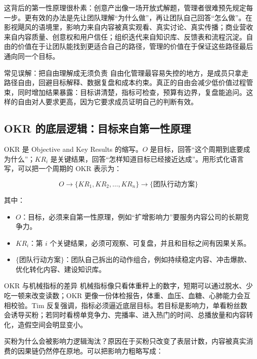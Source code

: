 这背后的第一性原理很朴素：创意产出像一场开放式解题，管理者很难预先规定每一步。更有效的办法是先让团队理解“为什么做”，再让团队自己回答“怎么做”。在影视飓风的语境里，影响力来自内容被真实观看、真实讨论、真实传播；商业营收来自内容质量、创意权和用户信任；组织迭代来自知识库、反馈表和流程沉淀。自由的价值在于让团队能找到更适合自己的路径，管理的价值在于保证这些路径最后通向同一个目标。

\begin{warningbox}{常见误解：把自由理解成无须负责}
自由化管理最容易失控的地方，是成员只拿走路径自由，回避目标解释、数据复盘和成本约束。真正的自由会减少低价值过程管束，同时增加结果暴露：目标讲清楚，指标可检查，预算有边界，复盘能追问。这样的自由对人要求更高，因为它要求成员证明自己的判断有效。
\end{warningbox}

\subsection{OKR 的底层逻辑：目标来自第一性原理}

OKR 是 Objective and Key Results 的缩写。$O$ 是目标，回答“这个周期到底要成为什么”；$KR_i$ 是关键结果，回答“怎样知道目标已经接近达成”。用形式化语言写，可以把一个周期的 OKR 表示为：

$$
O \longrightarrow \{KR_1, KR_2, \ldots, KR_n\} \longrightarrow \{\text{团队行动方案}\}
$$

其中：
\begin{itemize}
  \item $O$：目标，必须来自第一性原理，例如“扩增影响力”要服务内容公司的长期竞争力。
  \item $KR_i$：第 $i$ 个关键结果，必须可观察、可复盘，并且和目标之间有因果关系。
  \item $\{\text{团队行动方案}\}$：团队自己拆出的动作组合，例如持续稳定内容、冲击爆款、优化转化内容、建设知识库。
\end{itemize}

\begin{knowledgebox}{OKR 与机械指标的差异}
机械指标像只看体重秤上的数字，短期可以通过脱水、少吃一顿来改变读数；OKR 更像一份体检报告，体重、血压、血糖、心肺能力会互相校验。Tim 反复强调，指标必须逼近底层目标。若目标是影响力，单看粉丝数会诱导买粉；若同时看榜单竞争力、完播率、进入热门的时间、总播放量和内容转化，造假空间会明显变小。
\end{knowledgebox}

买粉为什么会被影响力逻辑淘汰？原因在于买粉只改变了表层计数，内容被真实消费的因果链仍然停在原地。可以把影响力粗略写成：


